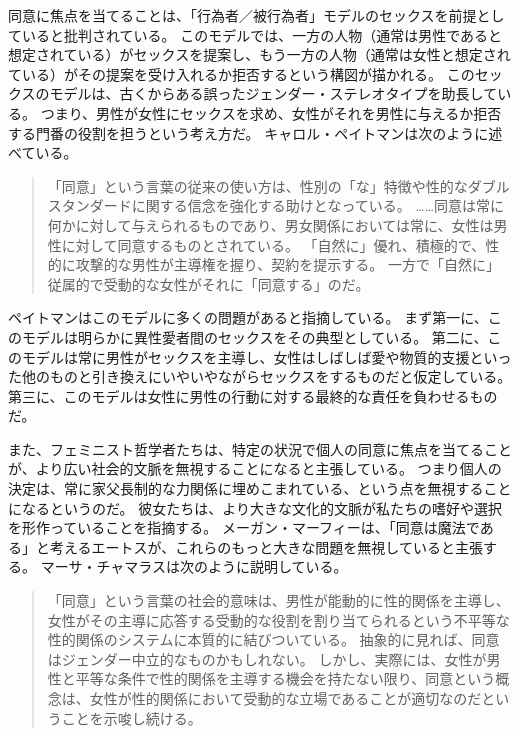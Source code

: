 \documentclass[paper=a4,book,openany]{jlreq}
\newcommand{\ig}[1]{}           %
\begin{document}
同意に焦点を当てることは、「行為者／被行為者」モデルのセックスを前提としていると批判されている。
このモデルでは、一方の人物（通常は男性であると想定されている）がセックスを提案し、もう一方の人物（通常は女性と想定されている）がその提案を受け入れるか拒否するという構図が描かれる。
このセックスのモデルは、古くからある誤ったジェンダー・ステレオタイプを助長している。
つまり、男性が女性にセックスを求め、女性がそれを男性に与えるか拒否する門番の役割を担うという考え方だ。
キャロル・ペイトマンは次のように述べている。

\begin{quote}
「同意」という言葉の従来の使い方は、性別の「な」特徴や性的なダブルスタンダードに関する信念を強化する助けとなっている。
……同意は常に何かに対して与えられるものであり、男女関係においては常に、女性は男性に対して同意するものとされている。
「自然に」優れ、積極的で、性的に攻撃的な男性が主導権を握り、契約を提示する。
一方で「自然に」従属的で受動的な女性がそれに「同意する」のだ。
\citep[p.164]{pateman80:_woman_consen}
\end{quote}

ペイトマンはこのモデルに多くの問題があると指摘している。
まず第一に、このモデルは明らかに異性愛者間のセックスをその典型としている。
第二に、このモデルは常に男性がセックスを主導し、女性はしばしば愛や物質的支援といった他のものと引き換えにいやいやながらセックスをするものだと仮定している。
第三に、このモデルは女性に男性の行動に対する最終的な責任を負わせるものだ。

また、フェミニスト哲学者たちは、特定の状況で個人の同意に焦点を当てることが、より広い社会的文脈を無視することになると主張している。
つまり個人の決定は、常に家父長制的な力関係に埋めこまれている、という点を無視することになるというのだ。
彼女たちは、より大きな文化的文脈が私たちの嗜好や選択を形作っていることを指摘する。
メーガン・マーフィー\ig{Meghan Murphy}は、「同意は魔法である」と考えるエートスが、これらのもっと大きな問題を無視していると主張する\citep{murphy13:_tyran_consen}。
マーサ・チャマラスは次のように説明している。

\begin{quote}
  「同意」という言葉の社会的意味は、男性が能動的に性的関係を主導し、女性がその主導に応答する受動的な役割を割り当てられるという不平等な性的関係のシステムに本質的に結びついている。
抽象的に見れば、同意はジェンダー中立的なものかもしれない。
しかし、実際には、女性が男性と平等な条件で性的関係を主導する機会を持たない限り、同意という概念は、女性が性的関係において受動的な立場であることが適切なのだということを示唆し続ける。
\citep[pp. 814-815]{chamallas88:_consen_equal_legalb}

\end{quote}
\end{document}
